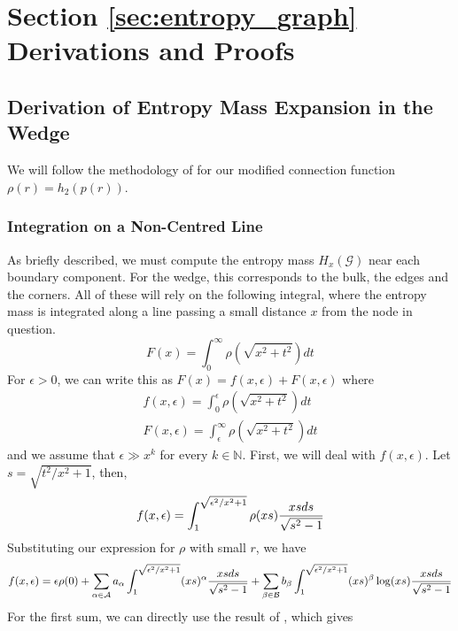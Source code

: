 \documentclass{article}
\newcommand{\graph}{\mathcal{G}}
\begin{document}
\label{compressibility_proof}

\section{Section \ref{sec:entropy_graph} Derivations and Proofs}
\label{sec:wedge_and_cantor}
\subsection{Derivation of Entropy Mass Expansion in the Wedge}
\label{sec:wedge}
We will follow the methodology of \cite{dettmann2016random} for our modified connection function $\rho(r) = h_2(p(r))$.
\subsubsection{Integration on a Non-Centred Line}
As briefly described, we must compute the entropy mass $H_x(\graph)$ near each boundary component. For the wedge, this corresponds to the bulk, the edges and the corners. All of these will rely on the following integral, where the entropy mass is integrated along a line passing a small distance $x$ from the node in question.
\begin{equation}
    F(x) = \int_0^{\infty} \rho(\sqrt{x^2+t^2})dt
\end{equation}
For $\epsilon > 0$, we can write this as $F(x) = f(x,\epsilon) + F(x,\epsilon)$ where
\begin{align}
    f(x,\epsilon) = \int_0^{\epsilon} \rho(\sqrt{x^2+t^2}) dt  \nonumber \\
    F(x,\epsilon) = \int_{\epsilon}^{\infty} \rho(\sqrt{x^2+t^2})dt
\end{align}
and we assume that $\epsilon \gg x^k$ for every $k\in \mathbb{N}$. First, we will deal with $f(x,\epsilon)$. Let $s = \sqrt{t^2/x^2 + 1}$, then,
\begin{equation}
    f(x,\epsilon) = \int_1^{\sqrt{\epsilon^2/x^2+1}} \rho(xs)\frac{xs\space ds}{\sqrt{s^2-1}}
\end{equation}
Substituting our expression for $\rho$ with small $r$, we have
\begin{equation}
    f(x,\epsilon) = \epsilon \rho(0) + \sum_{\alpha \in \mathcal{A}}a_{\alpha}\int_1^{\sqrt{\epsilon^2/x^2+1}} (xs)^{\alpha}\frac{xs \space ds}{\sqrt{s^2-1}}+ \sum_{\beta \in \mathcal{B}}b_{\beta}\int_1^{\sqrt{\epsilon^2/x^2+1}} (xs)^{\beta} \log(xs) \frac{xs \space ds}{\sqrt{s^2-1}}
\end{equation}
For the first sum, we can directly use the result of \cite{dettmann2016random}, which gives
\end{document}
